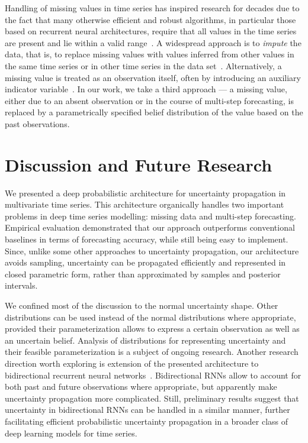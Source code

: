 \documentclass[runningheads]{llncs}
\begin{document}
Handling of missing values in time series has inspired research
for decades due to the fact that many otherwise efficient and
robust algorithms, in particular those based on recurrent neural
architectures, require that all values in the time series
are present and lie within a valid range~\cite{WSY+21}. A
widespread approach is to \textit{impute} the data,
that is, to replace missing values with values inferred from
other values in the same time series or in other time series
in the data set~\cite{KC18,SYG+19}. Alternatively, a
missing value is treated as an observation itself, often by
introducing an auxiliary indicator variable~\cite{LKW16,BDS21}.
In our work, we take a third approach --- a missing value,
either due to an absent observation or in the course of
multi-step forecasting, is replaced by a parametrically
specified belief distribution of the value based on the past
observations. 

\section{Discussion and Future Research}

We presented a deep probabilistic architecture for uncertainty
propagation in multivariate time series. This architecture
organically handles two important problems in deep time series
modelling: missing data and multi-step forecasting. Empirical
evaluation demonstrated that our approach outperforms
conventional baselines in terms of forecasting accuracy, while
still being easy to implement. Since, unlike some other
approaches to uncertainty propagation, our architecture
avoids sampling, uncertainty can be propagated efficiently and
represented in closed parametric form, rather than approximated
by samples and posterior intervals.

We confined most of the discussion to the normal uncertainty shape.
Other distributions can be used instead of the normal
distributions where appropriate, provided their parameterization
allows to express a certain observation as well as an uncertain
belief. Analysis of distributions for representing uncertainty
and their feasible parameterization is a subject of ongoing
research. Another research direction worth exploring is
extension of the presented architecture to bidirectional
recurrent neural networks~\cite{BRH15}. Bidirectional RNNs allow
to account for both past and future observations where
appropriate, but apparently make uncertainty propagation
more complicated. Still, preliminary results suggest that
uncertainty in bidirectional RNNs can be handled in a similar
manner, further facilitating efficient probabilistic uncertainty
propagation in a broader class of deep learning models for time
series.
\end{document}

